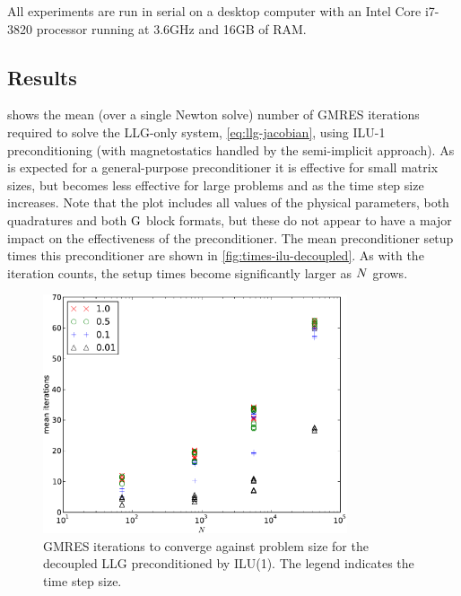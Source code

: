 All experiments are run in serial on a desktop computer with an Intel Core i7-3820 processor running at 3.6GHz and 16GB of RAM.


\subsection{Results}

 shows the mean (over a single Newton solve) number of GMRES iterations required to solve the LLG-only system, \cref{eq:llg-jacobian}, using ILU-1 preconditioning (\ie with magnetostatics handled by the semi-implicit approach).
As is expected for a general-purpose preconditioner it is effective for small matrix sizes, but becomes less effective for large problems and as the time step size increases.
Note that the plot includes all values of the physical parameters, both quadratures and both $\mathrm{G}$ block formats, but these do not appear to have a major impact on the effectiveness of the preconditioner.
The mean preconditioner setup times this preconditioner are shown in \cref{fig:times-ilu-decoupled}.
As with the iteration counts, the setup times become significantly larger as $N$ grows.

\begin{figure}
  \centering
  \includegraphics[width=0.8\textwidth]{plots/linear_solvers/ilu-1decoupleddummy-meanofnsolveritersvsinitialnnode.pdf}
  \caption{GMRES iterations to converge against problem size for the decoupled LLG preconditioned by ILU(1). The legend indicates the time step size.}
  \label{fig:its-ilu-decoupled}
\end{figure}

